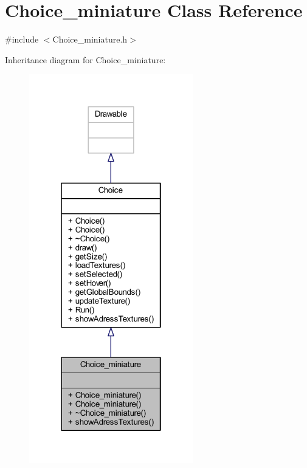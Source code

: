 \hypertarget{class_choice__miniature}{}\section{Choice\+\_\+miniature Class Reference}
\label{class_choice__miniature}


{\ttfamily \#include $<$Choice\+\_\+miniature.\+h$>$}



Inheritance diagram for Choice\+\_\+miniature\+:\nopagebreak
\begin{figure}[H]
\begin{center}
\leavevmode
\includegraphics[width=202pt]{class_choice__miniature__inherit__graph}
\end{center}
\end{figure}



